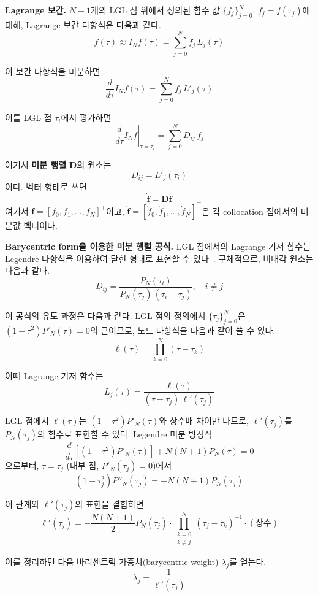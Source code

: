 \documentclass[11pt]{article}
\begin{document}
\textbf{Lagrange 보간.} $N+1$개의 LGL 점 위에서 정의된 함수 값 $\{f_j\}_{j=0}^{N}$, $f_j = f(\tau_j)$에 대해, Lagrange 보간 다항식은 다음과 같다.
\[
f(\tau) \approx I_N f(\tau) = \sum_{j=0}^{N} f_j\, L_j(\tau)
\]

이 보간 다항식을 미분하면
\[
\frac{d}{d\tau} I_N f(\tau) = \sum_{j=0}^{N} f_j\, L'_j(\tau)
\]

이를 LGL 점 $\tau_i$에서 평가하면
\[
\left. \frac{d}{d\tau} I_N f \right|_{\tau = \tau_i} = \sum_{j=0}^{N} D_{ij}\, f_j
\]

여기서 \textbf{미분 행렬} $\mathbf{D}$의 원소는
\begin{equation}
\label{eq:diffmat}
D_{ij} = L'_j(\tau_i)
\end{equation}
이다. 벡터 형태로 쓰면
\[
\dot{\mathbf{f}} = \mathbf{D} \mathbf{f}
\]
여기서 $\mathbf{f} = [f_0, f_1, \ldots, f_N]^\top$이고, $\dot{\mathbf{f}} = [\dot{f}_0, \dot{f}_1, \ldots, \dot{f}_N]^\top$은 각 collocation 점에서의 미분값 벡터이다.

\textbf{Barycentric form을 이용한 미분 행렬 공식.} LGL 점에서의 Lagrange 기저 함수는 Legendre 다항식을 이용하여 닫힌 형태로 표현할 수 있다~\cite{Garg2010}. 구체적으로, 비대각 원소는 다음과 같다.
\begin{equation}
\label{eq:offdiag}
D_{ij} = \frac{P_N(\tau_i)}{P_N(\tau_j)\, (\tau_i - \tau_j)}, \quad i \neq j
\end{equation}

이 공식의 유도 과정은 다음과 같다. LGL 점의 정의에서 $\{\tau_j\}_{j=0}^{N}$은 $(1 - \tau^2) P'_N(\tau) = 0$의 근이므로, 노드 다항식을 다음과 같이 쓸 수 있다.
\[
\ell(\tau) = \prod_{k=0}^{N} (\tau - \tau_k)
\]

이때 Lagrange 기저 함수는
\[
L_j(\tau) = \frac{\ell(\tau)}{(\tau - \tau_j)\, \ell'(\tau_j)}
\]

LGL 점에서 $\ell(\tau)$는 $(1 - \tau^2) P'_N(\tau)$와 상수배 차이만 나므로, $\ell'(\tau_j)$를 $P_N(\tau_j)$의 함수로 표현할 수 있다. Legendre 미분 방정식
\[
\frac{d}{d\tau}\!\left[(1 - \tau^2) P'_N(\tau)\right] + N(N+1) P_N(\tau) = 0
\]
으로부터, $\tau = \tau_j$ (내부 점, $P'_N(\tau_j) = 0$)에서
\[
(1 - \tau_j^2) P''_N(\tau_j) = -N(N+1) P_N(\tau_j)
\]

이 관계와 $\ell'(\tau_j)$의 표현을 결합하면
\[
\ell'(\tau_j) = -\frac{N(N+1)}{2} P_N(\tau_j) \cdot \prod_{\substack{k=0 \\ k \neq j}}^{N} (\tau_j - \tau_k)^{-1} \cdot (\text{상수})
\]

이를 정리하면 다음 바리센트릭 가중치(barycentric weight) $\lambda_j$를 얻는다.
\[
\lambda_j = \frac{1}{\ell'(\tau_j)}
\]
\end{document}
